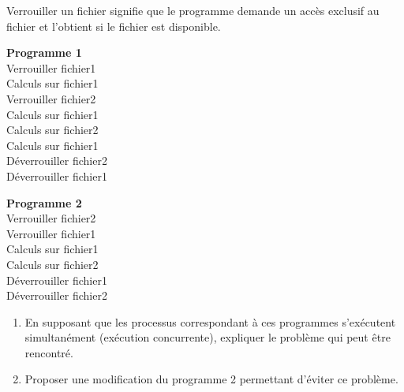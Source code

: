 \documentclass[a4paper,12pt,french]{book}
\begin{document}
\begin{enumerate}[\bfseries 1.]
    Verrouiller un fichier signifie que le programme demande un accès exclusif au
    fichier et l’obtient si le fichier est disponible.

    \begin{multicols}{2}
    \textbf{Programme 1}\\

    Verrouiller fichier1\\
    Calculs sur fichier1\\
    Verrouiller fichier2\\
    Calculs sur fichier1\\
    Calculs sur fichier2\\
    Calculs sur fichier1\\
    Déverrouiller fichier2\\
    Déverrouiller fichier1\\
    \columnbreak

    \textbf{Programme 2}\\

    Verrouiller fichier2\\
    Verrouiller fichier1\\
    Calculs sur fichier1\\
    Calculs sur fichier2\\
    Déverrouiller fichier1\\
    Déverrouiller fichier2
    \end{multicols}
    \begin{enumerate}[\bfseries a.]
    	\item 	En supposant que les processus correspondant à ces programmes s’exécutent
        simultanément (exécution concurrente), expliquer le problème qui peut être
        rencontré.
    	\item 	Proposer une modification du programme 2 permettant d’éviter ce problème.
    \end{enumerate}
\end{enumerate}
\end{document}
